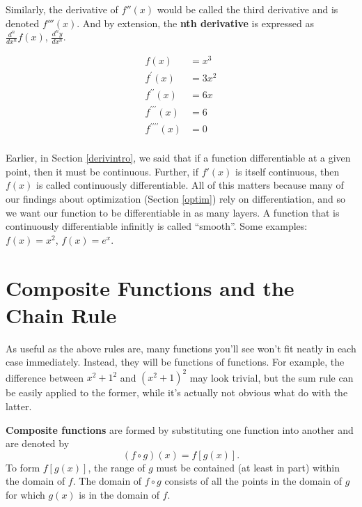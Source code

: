 \documentclass[]{book}
\theoremstyle{definition}
\theoremstyle{definition}
\theoremstyle{definition}
\theoremstyle{remark}
\let\BeginKnitrBlock\begin \let\EndKnitrBlock\end
\begin{document}
Similarly, the derivative of \(f''(x)\) would be called the third derivative and is denoted \(f'''(x)\). And by extension, the \textbf{nth derivative} is expressed as \(\frac{d^n}{dx^n}f(x)\), \(\frac{d^ny}{dx^n}\).

\BeginKnitrBlock{example}[Succession of Derivatives]
\protect\hypertarget{exm:unnamed-chunk-16}{}{\label{exm:unnamed-chunk-16} {} }\begin{align*}
f(x) &=x^3\\
f^{\prime}(x) &=3x^2\\
f^{\prime\prime}(x) &=6x \\
f^{\prime\prime\prime}(x) &=6\\
f^{\prime\prime\prime\prime}(x) &=0\\
\end{align*}
\EndKnitrBlock{example}

Earlier, in Section \ref{derivintro}, we said that if a function differentiable at a given point, then it must be continuous. Further, if \(f'(x)\) is itself continuous, then \(f(x)\) is called continuously differentiable. All of this matters because many of our findings about optimization (Section \ref{optim}) rely on differentiation, and so we want our function to be differentiable in as many layers. A function that is continuously differentiable infinitly is called ``smooth''. Some examples: \(f(x) = x^2\), \(f(x) = e^x\).

\hypertarget{composite-functions-and-the-chain-rule}{%
\section{Composite Functions and the Chain Rule}\label{composite-functions-and-the-chain-rule}}

As useful as the above rules are, many functions you'll see won't fit neatly in each case immediately. Instead, they will be functions of functions. For example, the difference between \(x^2 + 1^2\) and \((x^2 + 1)^2\) may look trivial, but the sum rule can be easily applied to the former, while it's actually not obvious what do with the latter.

\textbf{Composite functions} are formed by substituting one function into another and are denoted by \[(f\circ g)(x)=f[g(x)].\] To form \(f[g(x)]\), the range of \(g\) must be contained (at least in part) within the domain of \(f\). The domain of \(f\circ g\) consists of all the points in the domain of \(g\) for which \(g(x)\) is in the domain of \(f\).
\end{document}
